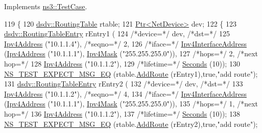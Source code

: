 Implements \hyperlink{classns3_1_1TestCase_a8ff74680cf017ed42011e4be51917a24}{ns3\+::\+Test\+Case}.


\begin{DoxyCode}
119 \{
120   \hyperlink{classns3_1_1dsdv_1_1RoutingTable}{dsdv::RoutingTable} rtable;
121   \hyperlink{classns3_1_1Ptr}{Ptr<NetDevice>} dev;
122   \{
123     \hyperlink{classns3_1_1dsdv_1_1RoutingTableEntry}{dsdv::RoutingTableEntry} rEntry1 (
124       \textcolor{comment}{/*device=*/} dev, \textcolor{comment}{/*dst=*/}
125       \hyperlink{classns3_1_1Ipv4Address}{Ipv4Address} (\textcolor{stringliteral}{"10.1.1.4"}), \textcolor{comment}{/*seqno=*/} 2,
126       \textcolor{comment}{/*iface=*/} \hyperlink{classns3_1_1Ipv4InterfaceAddress}{Ipv4InterfaceAddress} (\hyperlink{classns3_1_1Ipv4Address}{Ipv4Address} (\textcolor{stringliteral}{"10.1.1.1"}), 
      \hyperlink{classns3_1_1Ipv4Mask}{Ipv4Mask} (\textcolor{stringliteral}{"255.255.255.0"})),
127       \textcolor{comment}{/*hops=*/} 2, \textcolor{comment}{/*next hop=*/}
128       \hyperlink{classns3_1_1Ipv4Address}{Ipv4Address} (\textcolor{stringliteral}{"10.1.1.2"}),
129       \textcolor{comment}{/*lifetime=*/} \hyperlink{group__timecivil_ga33c34b816f8ff6628e33d5c8e9713b9e}{Seconds} (10));
130     \hyperlink{group__testing_ga7304ba46a28d8cf08dfdfd6499cf7068}{NS\_TEST\_EXPECT\_MSG\_EQ} (rtable.\hyperlink{classns3_1_1dsdv_1_1RoutingTable_a4eed9bac83e90f1db01e414892e10b9b}{AddRoute} (rEntry1),\textcolor{keyword}{true},\textcolor{stringliteral}{"add route"});
131     \hyperlink{classns3_1_1dsdv_1_1RoutingTableEntry}{dsdv::RoutingTableEntry} rEntry2 (
132       \textcolor{comment}{/*device=*/} dev, \textcolor{comment}{/*dst=*/}
133       \hyperlink{classns3_1_1Ipv4Address}{Ipv4Address} (\textcolor{stringliteral}{"10.1.1.2"}), \textcolor{comment}{/*seqno=*/} 4,
134       \textcolor{comment}{/*iface=*/} \hyperlink{classns3_1_1Ipv4InterfaceAddress}{Ipv4InterfaceAddress} (\hyperlink{classns3_1_1Ipv4Address}{Ipv4Address} (\textcolor{stringliteral}{"10.1.1.1"}), 
      \hyperlink{classns3_1_1Ipv4Mask}{Ipv4Mask} (\textcolor{stringliteral}{"255.255.255.0"})),
135       \textcolor{comment}{/*hops=*/} 1, \textcolor{comment}{/*next hop=*/}
136       \hyperlink{classns3_1_1Ipv4Address}{Ipv4Address} (\textcolor{stringliteral}{"10.1.1.2"}),
137       \textcolor{comment}{/*lifetime=*/} \hyperlink{group__timecivil_ga33c34b816f8ff6628e33d5c8e9713b9e}{Seconds} (10));
138     \hyperlink{group__testing_ga7304ba46a28d8cf08dfdfd6499cf7068}{NS\_TEST\_EXPECT\_MSG\_EQ} (rtable.\hyperlink{classns3_1_1dsdv_1_1RoutingTable_a4eed9bac83e90f1db01e414892e10b9b}{AddRoute} (rEntry2),\textcolor{keyword}{true},\textcolor{stringliteral}{"add route"});

\end{DoxyCode}
